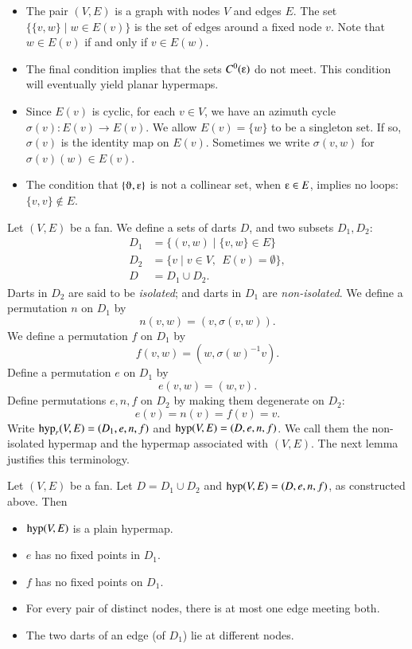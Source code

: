 \begin{remark}
\begin{itemize}
\item The pair $(V,E)$ is a graph with nodes $V$ and edges $E$.  The set
$\{\{v,w\}\mid w\in E(v)\}$ is the set of edges around a fixed node $v$.
Note that $w\in E(v)$ if and only if $v\in E(w)$.   
%
\item The final condition implies that the sets $C^0(\e)$
do not meet.   This condition will eventually yield planar
hypermaps.
%
\item
Since $E(v)$ is cyclic,
for each $v\in V$, we have an azimuth cycle $\sigma(v):E(v)\to E(v)$.
We allow $E(v) = \{w\}$ to be a
singleton set. If so,
$\sigma(v)$ is the identity map on $E(v)$.
%
Sometimes we write $\sigma(v,w)$ for $\sigma(v)(w)\in E(v)$.
%
\item 
The condition that $\{\orgn,\e\}$ is not a collinear set, when $\e\in
E$, implies no loops: $\{v,v\}\not\in E$.
%
\end{itemize}
\end{remark}


Let $(V,E)$ be a fan.  We define a sets of darts $D$, and
two subsets $D_1,D_2$:
    $$
    \begin{array}{lll}
    D_1 &= \{(v,w)\mid \{v,w\}\in E\}\\
    D_2 &= \{v \mid v\in V,\ \ E(v) = \emptyset\},\\
    D   &= D_1\cup D_2.
    \end{array}
    $$
Darts in $D_2$ are said to be {\it isolated}; and darts in $D_1$ are {\it non-isolated}.
%
We define a permutation $n$ on $D_1$ by
    $$n(v,w) = (v,\sigma(v,w)).$$
We define a permutation $f$ on $D_1$ by
    $$
    f (v,w) = (w,\sigma(w)^{-1} v).
    $$
Define a permutation $e$ on $D_1$ by
    $$
    e (v,w) = (w,v).
    $$
Define permutations $e,n,f$ on $D_2$ by making them degenerate on $D_2$:
    $$
    e (v) = n(v) = f(v) = v.
    $$
Write ${\operatorname{hyp}}_r(V,E)=(D_1,e,n,f)$ and ${\operatorname{hyp}}(V,E)=(D,e,n,f)$.  We call them the non-isolated hypermap
and the hypermap associated with $(V,E)$.  The next
lemma justifies this terminology.



\begin{lemma}
Let $(V,E)$ be a fan.  Let $D = D_1\cup D_2$
and ${\operatorname{hyp}}(V,E) = (D,e,n,f)$, as constructed above.  Then
    \begin{itemize}
    \item ${\operatorname{hyp}}(V,E)$ is a plain hypermap.
    \item  $e$ has no fixed
points in $D_1$.
    \item  $f$ has no fixed points on $D_1$.
    \item For every pair of distinct nodes, there is at most one
    edge meeting both.
    \item The two darts of an edge (of $D_1$) lie at different nodes.
    \end{itemize}
\end{lemma}

